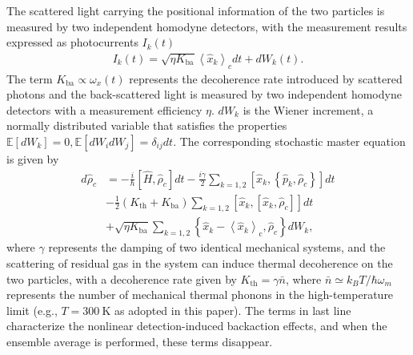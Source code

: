 \documentclass[
aps,
reprint,
superscriptaddress,
amsmath,amssymb,
pra
]{revtex4-2}
\begin{document}
The scattered light carrying the positional information of the two particles is measured by two independent homodyne detectors, with the measurement results expressed as photocurrents $I_k(t)$
\begin{align}
{{I}_{k}}\left( t \right)=\sqrt{\eta {{K }_{\text{ba}}}}\left\langle {\hat{x}_{k}} \right\rangle_c dt+d{{W}_{k}}\left( t \right).
\end{align}
The term $K_\text{ba}\propto \omega_x(t)$ represents the decoherence rate introduced by scattered photons and the back-scattered light is measured by two independent homodyne detectors with a measurement efficiency $\eta$. $dW_k$ is the Wiener increment, a normally distributed variable that satisfies the properties $\mathbb{E} [dW_k]=0,\mathbb{E} [dW_idW_j]=\delta _{ij}dt$. The corresponding stochastic master equation is given by
\begin{align}
  d{\hat{\rho }_{c}}&=-\frac{i}{\hbar}\left[\hat H,{\hat{\rho }_{c}} \right]dt-\frac{i\gamma }{2}\sum\limits_{k=1,2}{\left[ {\hat{x}_{k}},\left\{ {\hat{p}_{k}},{{\hat \rho }_{c}} \right\} \right]}dt \nonumber  \\
 &-\frac{1}{2}\left( {{K }_{\text{th}}}+{{K }_{\text{ba}}} \right)\sum\limits_{k=1,2}{\left[ {\hat{x}_{k}},\left[ {\hat{x}_{k}},{{\hat \rho }_{c}} \right] \right]}dt \nonumber  \\
 &+\sqrt{\eta {{K }_{\text{ba}}}}\sum\limits_{k=1,2}{\left\{ {\hat{x}_{k}}-{{\left\langle {\hat{x}_{k}} \right\rangle }_{\text{c}}},{{\hat \rho }_{c}} \right\}d{{W}_{k}}},
\end{align}
where $\gamma$ represents the damping of two identical mechanical systems, and the scattering of residual gas in the system can induce thermal decoherence on the two particles, with a decoherence rate given by $K_\text{th}=\gamma \bar{n}$, where $\bar{n} \simeq k_BT/\hbar\omega_m$ represents the number of mechanical thermal phonons in the high-temperature limit (e.g., $T = 300~\mathrm K$ as adopted in this paper). The terms in last line characterize the nonlinear detection-induced backaction effects, and when the ensemble average is performed, these terms disappear.

\end{document}

